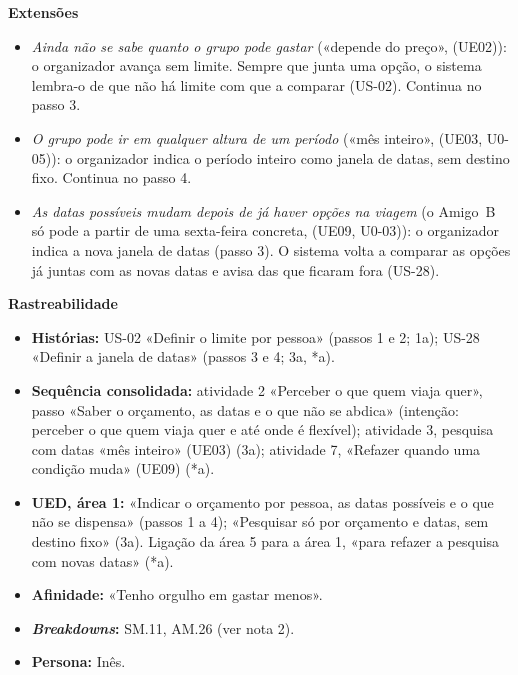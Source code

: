 \documentclass[11pt,a4paper]{article}
\newcommand{\reg}[1]{{\footnotesize\textcolor{pendente}{(#1)}}}
\newenvironment{usecase}[2]{%
  \par\medskip\noindent{\large\bfseries\color{roamly}#1: #2}\par\smallskip\small\noindent\ignorespaces}{\par\medskip}
\begin{document}
\begin{usecase}{UC-01}{Definir os limites da viagem}
\textbf{Extensões}
\begin{itemize}[leftmargin=2.2em]
  \item[1a.] \textit{Ainda não se sabe quanto o grupo pode gastar} («depende do preço», \reg{UE02}): o organizador avança sem limite. Sempre que junta uma opção, o sistema lembra-o de que não há limite com que a comparar (US-02). Continua no passo 3.
  \item[3a.] \textit{O grupo pode ir em qualquer altura de um período} («mês inteiro», \reg{UE03, U0-05}): o organizador indica o período inteiro como janela de datas, sem destino fixo. Continua no passo 4.
  \item[*a.] \textit{As datas possíveis mudam depois de já haver opções na viagem} (o Amigo~B só pode a partir de uma sexta-feira concreta, \reg{UE09, U0-03}): o organizador indica a nova janela de datas (passo 3). O sistema volta a comparar as opções já juntas com as novas datas e avisa das que ficaram fora (US-28).
\end{itemize}

\textbf{Rastreabilidade}
\begin{itemize}
  \item \textbf{Histórias:} US-02 «Definir o limite por pessoa» (passos 1 e 2; 1a); US-28 «Definir a janela de datas» (passos 3 e 4; 3a, *a).
  \item \textbf{Sequência consolidada:} atividade 2 «Perceber o que quem viaja quer», passo «Saber o orçamento, as datas e o que não se abdica» (intenção: perceber o que quem viaja quer e até onde é flexível); atividade 3, pesquisa com datas «mês inteiro» \reg{UE03} (3a); atividade 7, «Refazer quando uma condição muda» \reg{UE09} (*a).
  \item \textbf{UED, área 1:} «Indicar o orçamento por pessoa, as datas possíveis e o que não se dispensa» (passos 1 a 4); «Pesquisar só por orçamento e datas, sem destino fixo» (3a). Ligação da área 5 para a área 1, «para refazer a pesquisa com novas datas» (*a).
  \item \textbf{Afinidade:} «Tenho orgulho em gastar menos».
  \item \textbf{\textit{Breakdowns}:} SM.11, AM.26 (ver nota 2).
  \item \textbf{Persona:} Inês.
\end{itemize}
\end{usecase}
\end{document}
